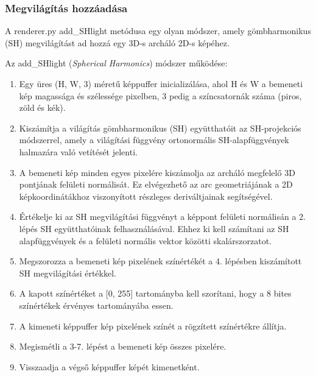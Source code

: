\documentclass[12pt,a4]{article}
\begin{document}
\subsubsection{Megvilágítás hozzáadása}
A renderer.py add\_SHlight metódusa egy olyan módszer, amely gömbharmonikus (SH) megvilágítást ad hozzá egy 3D-s archáló 2D-s képéhez.

Az add\_SHlight (\textit{Spherical Harmonics}) módszer működése:

\begin{enumerate}
    \item Egy üres (H, W, 3) méretű képpuffer inicializálása, ahol H és W a bemeneti kép magassága és szélessége pixelben, 3 pedig a színcsatornák száma (piros, zöld és kék).

    \item Kiszámítja a világítás gömbharmonikus (SH) együtthatóit az SH-projekciós módszerrel, amely a világítási függvény ortonormális SH-alapfüggvények halmazára való vetítését jelenti.

    \item A bemeneti kép minden egyes pixelére kiszámolja az archáló megfelelő 3D pontjának felületi normálisát. Ez elvégezhető az arc geometriájának a 2D képkoordinátákhoz viszonyított részleges deriváltjainak segítségével.

    \item Értékelje ki az SH megvilágítási függvényt a képpont felületi normálisán a 2. lépés SH együtthatóinak felhasználásával. Ehhez ki kell számítani az SH alapfüggvények és a felületi normális vektor közötti skalárszorzatot.

    \item Megszorozza a bemeneti kép pixelének színértékét a 4. lépésben kiszámított SH megvilágítási értékkel.

    \item A kapott színértéket a [0, 255] tartományba kell szorítani, hogy a 8 bites színértékek érvényes tartományába essen.

    \item A kimeneti képpuffer kép pixelének színét a rögzített színértékre állítja.

    \item Megismétli a 3-7. lépést a bemeneti kép összes pixelére.

    \item Visszaadja a végső képpuffer képét kimenetként.

    
\end{enumerate}
\end{document}
